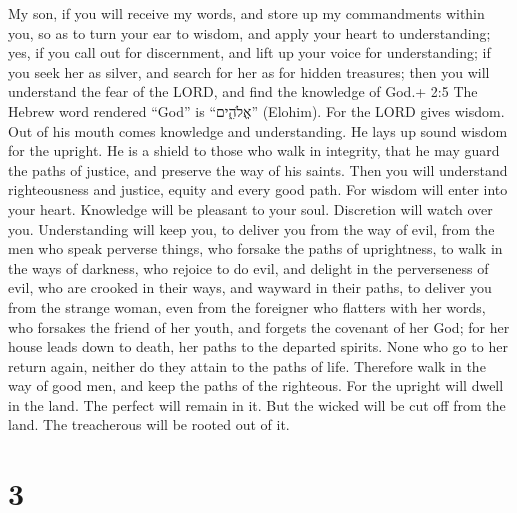  My son, if you will receive my words, and store up my
commandments within you,  so as to turn your ear to wisdom,
and apply your heart to understanding;  yes, if you call out
for discernment, and lift up your voice for understanding; 
if you seek her as silver, and search for her as for hidden treasures;
 then you will understand the fear of the LORD, and find the
knowledge of God.+ 2:5 The Hebrew word rendered ``God'' is ``אֱלֹהִ֑ים''
(Elohim).  For the LORD gives wisdom. Out of his mouth comes
knowledge and understanding.  He lays up sound wisdom for
the upright. He is a shield to those who walk in integrity, 
that he may guard the paths of justice, and preserve the way of his
saints.  Then you will understand righteousness and justice,
equity and every good path.  For wisdom will enter into
your heart. Knowledge will be pleasant to your soul. 
Discretion will watch over you. Understanding will keep you,
 to deliver you from the way of evil, from the men who
speak perverse things,  who forsake the paths of
uprightness, to walk in the ways of darkness,  who rejoice
to do evil, and delight in the perverseness of evil,  who
are crooked in their ways, and wayward in their paths,  to
deliver you from the strange woman, even from the foreigner who flatters
with her words,  who forsakes the friend of her youth, and
forgets the covenant of her God;  for her house leads down
to death, her paths to the departed spirits.  None who go
to her return again, neither do they attain to the paths of life.
 Therefore walk in the way of good men, and keep the paths
of the righteous.  For the upright will dwell in the land.
The perfect will remain in it.  But the wicked will be cut
off from the land. The treacherous will be rooted out of it.

\hypertarget{section-2}{%
\section{3}\label{section-2}}

